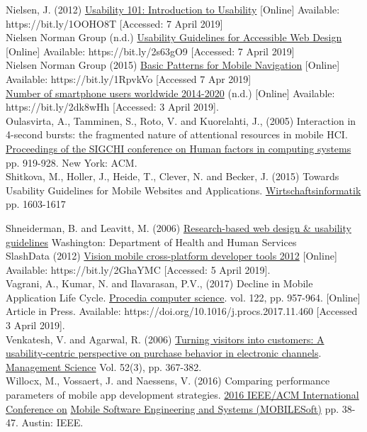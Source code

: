 \documentclass[version=last,fontsize=13pt]{scrartcl}
\begin{document}
Nielsen, J. (2012) \underline{Usability 101: Introduction to Usability} [Online] Available:\\ https://bit.ly/1OOHO8T [Accessed: 7 April 2019]\\

Nielsen Norman Group (n.d.) \underline{Usability Guidelines for Accessible Web Design} [Online] Available:  https://bit.ly/2s63gO9 [Accessed: 7 April 2019]\\

Nielsen Norman Group (2015) \underline{Basic Patterns for Mobile Navigation} [Online] Available: https://bit.ly/1RpvkVo [Accessed 7 Apr 2019]\\

\underline{Number of smartphone users worldwide 2014-2020} (n.d.) [Online]  Available:\\ https://bit.ly/2dk8wHh [Accessed: 3 April 2019].\\

Oulasvirta, A., Tamminen, S., Roto, V. and Kuorelahti, J., (2005) Interaction in 4-second bursts: the fragmented nature of attentional resources in mobile HCI. \\

\underline{ Proceedings of the SIGCHI conference on Human factors in computing systems} pp. 919-928. New York: ACM. \\

Shitkova, M., Holler, J., Heide, T., Clever, N. and Becker, J. (2015)  Towards Usability Guidelines for Mobile Websites and Applications.  \underline{Wirtschaftsinformatik} pp. 1603-1617

Shneiderman, B. and Leavitt, M. (2006) \underline{Research-based web design \& usability guidelines} Washington: Department of Health and Human Services\\

SlashData (2012) \underline{Vision mobile cross-platform developer tools 2012}  [Online] Available: https://bit.ly/2GhaYMC [Accessed: 5 April 2019].\\

Vagrani, A., Kumar, N. and Ilavarasan, P.V., (2017) Decline in Mobile Application Life Cycle. \underline{Procedia computer science}. vol. 122, pp. 957-964. [Online] Article in Press. Available: https://doi.org/10.1016/j.procs.2017.11.460 [Accessed 3 April 2019].\\

Venkatesh, V. and Agarwal, R. (2006) \underline{Turning visitors into customers: A usability-centric perspective on purchase behavior in electronic channels}. \underline{Management Science} Vol. 52(3),  pp. 367-382.\\

Willocx, M., Vossaert, J. and Naessens, V. (2016) Comparing performance parameters of mobile app development strategies.  \underline{2016 IEEE/ACM International Conference on} \underline{Mobile Software Engineering and Systems (MOBILESoft)} pp. 38-47.  Austin: IEEE.\\
\end{document}
